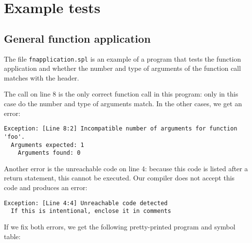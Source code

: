 \documentclass[a4paper]{article}
\begin{document}
\newpage 
\section{Example tests}
\label{examples}

\subsection{General function application}
The file {\tt fnapplication.spl} is an example of a program that tests the function application and whether the number and type of arguments of the function call matches with the header.

The call on line 8 is the only correct function call in this program: only in this case do the number and type of arguments match. In the other cases, we get an error: 
\begin{verbatim}
Exception: [Line 8:2] Incompatible number of arguments for function 'foo'.
  Arguments expected: 1
    Arguments found: 0
\end{verbatim}
Another error is the unreachable code on line 4: because this code is listed after a return statement, this cannot be executed. Our compiler does not accept this code and produces an error: 
\begin{verbatim}
Exception: [Line 4:4] Unreachable code detected
  If this is intentional, enclose it in comments
\end{verbatim}
If we fix both errors, we get the following pretty-printed program and symbol table: 
\end{document}
